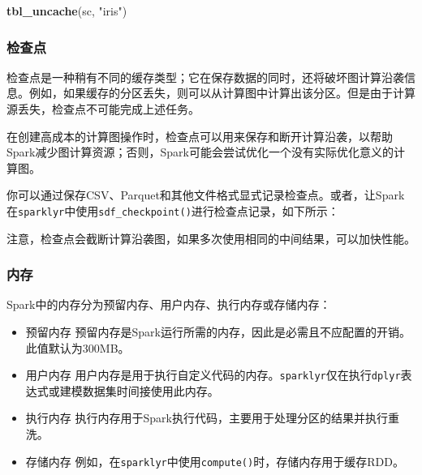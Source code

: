 \documentclass[
]{article}
\newenvironment{Shaded}{\begin{snugshade}}{\end{snugshade}}
\newcommand{\CommentTok}[1]{\textcolor[rgb]{0.56,0.35,0.01}{\textit{#1}}}
\newcommand{\KeywordTok}[1]{\textcolor[rgb]{0.13,0.29,0.53}{\textbf{#1}}}
\newcommand{\NormalTok}[1]{#1}
\newcommand{\OperatorTok}[1]{\textcolor[rgb]{0.81,0.36,0.00}{\textbf{#1}}}
\newcommand{\StringTok}[1]{\textcolor[rgb]{0.31,0.60,0.02}{#1}}
\providecommand{\tightlist}{%
  \setlength{\itemsep}{0pt}\setlength{\parskip}{0pt}}
\begin{document}
\begin{Shaded}
\begin{Highlighting}[]
\KeywordTok{tbl_uncache}\NormalTok{(sc, }\StringTok{"iris"}\NormalTok{)}
\end{Highlighting}
\end{Shaded}

\hypertarget{ux68c0ux67e5ux70b9}{%
\subsubsection{检查点}\label{ux68c0ux67e5ux70b9}}

检查点是一种稍有不同的缓存类型；它在保存数据的同时，还将破坏图计算沿袭信息。例如，如果缓存的分区丢失，则可以从计算图中计算出该分区。但是由于计算源丢失，检查点不可能完成上述任务。

在创建高成本的计算图操作时，检查点可以用来保存和断开计算沿袭，以帮助Spark减少图计算资源；否则，Spark可能会尝试优化一个没有实际优化意义的计算图。

你可以通过保存CSV、Parquet和其他文件格式显式记录检查点。或者，让Spark在\texttt{sparklyr}中使用\texttt{sdf\_checkpoint()}进行检查点记录，如下所示：

\begin{Shaded}
\end{Shaded}

注意，检查点会截断计算沿袭图，如果多次使用相同的中间结果，可以加快性能。

\hypertarget{ux5185ux5b58-1}{%
\subsubsection{内存}\label{ux5185ux5b58-1}}

Spark中的内存分为预留内存、用户内存、执行内存或存储内存：

\begin{itemize}
\tightlist
\item
  预留内存
  预留内存是Spark运行所需的内存，因此是必需且不应配置的开销。此值默认为300MB。
\item
  用户内存
  用户内存是用于执行自定义代码的内存。\texttt{sparklyr}仅在执行\texttt{dplyr}表达式或建模数据集时间接使用此内存。
\item
  执行内存 执行内存用于Spark执行代码，主要用于处理分区的结果并执行重洗。
\item
  存储内存
  例如，在\texttt{sparklyr}中使用\texttt{compute()}时，存储内存用于缓存RDD。
\end{itemize}
\end{document}
